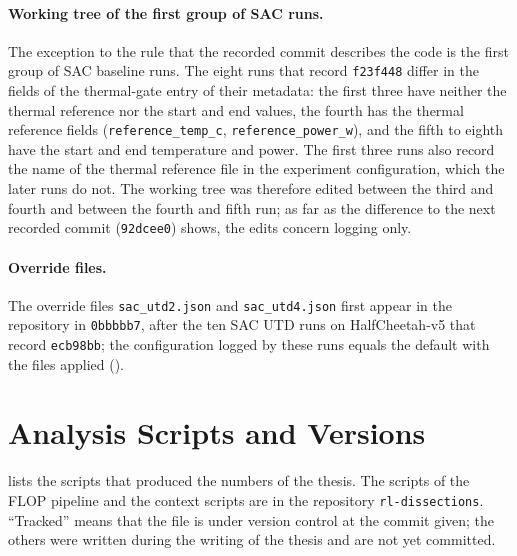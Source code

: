 \paragraph{Working tree of the first group of SAC runs.} The exception to the rule that the recorded commit describes the code is the first group of SAC baseline runs.
The eight runs that record \texttt{f23f448} differ in the fields of the thermal-gate entry of their metadata: the first three have neither the thermal reference nor the start and end values, the fourth has the thermal reference fields (\texttt{reference\_\allowbreak temp\_\allowbreak c}, \texttt{reference\_\allowbreak power\_\allowbreak w}), and the fifth to eighth have the start and end temperature and power.
The first three runs also record the name of the thermal reference file in the experiment configuration, which the later runs do not.
The working tree was therefore edited between the third and fourth and between the fourth and fifth run; as far as the difference to the next recorded commit (\texttt{92dcee0}) shows, the edits concern logging only.

\paragraph{Override files.} The override files \texttt{sac\_\allowbreak utd2.json} and \texttt{sac\_\allowbreak utd4.json} first appear in the repository in \texttt{0bbbbb7}, after the ten SAC UTD runs on HalfCheetah-v5 that record \texttt{ecb98bb}; the configuration logged by these runs equals the default with the files applied ().

\section{Analysis Scripts and Versions}\label{sec:app-repro-scripts}

 lists the scripts that produced the numbers of the thesis.
The scripts of the FLOP pipeline and the context scripts are in the repository \texttt{rl-dissections}.
``Tracked'' means that the file is under version control at the commit given; the others were written during the writing of the thesis and are not yet committed.

